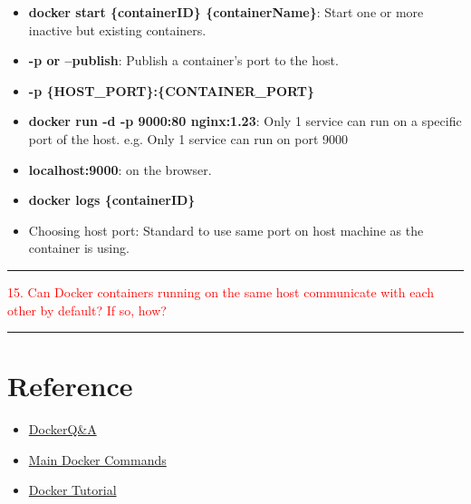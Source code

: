 \documentclass{article}
\begin{document}
\begin{tcolorbox}[colback=red!5!white, colframe=red!50!black,title=Commands]
\begin{itemize}
    \item \textbf{docker start \{containerID\} \{containerName\}}: Start one or more inactive but existing containers.
    \item \textbf{-p or --publish}: Publish a container's port to the host.
    \item \textbf{-p \{HOST\_PORT\}:\{CONTAINER\_PORT\} }
    \item \textbf{docker run -d -p 9000:80 nginx:1.23}: Only 1 service can run on a specific port of the host. e.g. Only 1 service can run on port 9000
    \item \textbf{localhost:9000}: on the browser.
    \item \textbf{docker logs \{containerID\} }
    \item Choosing host port: Standard to use same port on host machine as the container is using.
\end{itemize}
\end{tcolorbox}

\noindent
{\color{red} \rule{\linewidth}{0.5mm}}
\textcolor{red}{15. Can Docker containers running on the same host communicate with each other by default? If so, how?} \\
\noindent
{\color{red} \rule{\linewidth}{0.5mm}}
\section{Reference}
\begin{itemize}
    \item \href{https://github.com/Devinterview-io/docker-interview-questions}{DockerQ\&A}
    \item \href{https://labs.iximiuz.com/tutorials/docker-container-management-commands}{Main Docker Commands}
    \item \href{https://github.com/iam-veeramalla/Docker-Zero-to-Hero}{Docker Tutorial}
\end{itemize}
\end{document}
